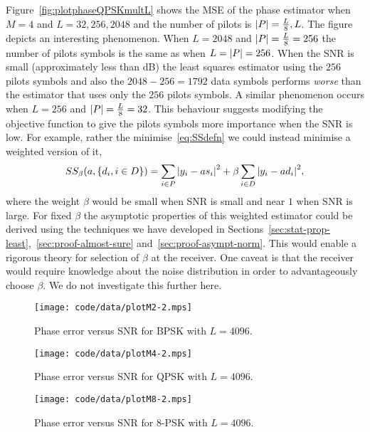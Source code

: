 \documentclass[journal]{IEEEtran}
\begin{document}
Figure~\ref{fig:plotphaseQPSKmultL} shows the MSE of the phase estimator when $M=4$ and $L=32,256, 2048$ and the number of pilots is ${\left\vert P \right\vert}=\tfrac{L}{8},L$.  The figure depicts an interesting phenomenon.  When $L=2048$ and ${\left\vert P \right\vert} = \tfrac{L}{8} = 256$ the number of pilots symbols is the same as when $L={\left\vert P \right\vert} = 256$.  When the SNR is small (approximately less than \unit[0]{dB}) the least squares estimator using the $256$ pilots symbols and also the $2048-256=1792$ data symbols performs \emph{worse} than the estimator that uses only the $256$ pilots symbols.  A similar phenomenon occurs when $L=256$ and ${\left\vert P \right\vert} = \tfrac{L}{8} = 32$.  %
This behaviour suggests modifying the objective function to give the pilots symbols more importance when the SNR is low.  For example, rather the minimise~\eqref{eq:SSdefn} we could instead minimise a weighted version of it,
\[
SS_{\beta}(a, \{d_i, i \in D\}) = \sum_{i \in P} {\left\vert  y_i - a s_i  \right\vert}^2 + \beta \sum_{i \in D} {\left\vert  y_i - a d_i  \right\vert}^2,
\]
where the weight $\beta$ would be small when SNR is small and near $1$ when SNR is large.  For fixed $\beta$ the asymptotic properties of this weighted estimator could be derived using the techniques we have developed in Sections~\ref{sec:stat-prop-least},~\ref{sec:proof-almost-sure} and~\ref{sec:proof-asympt-norm}.  This would enable a rigorous theory for selection of $\beta$ at the receiver.  One caveat is that the receiver would require knowledge about the noise distribution in order to advantageously choose $\beta$.  We do not investigate this further here.

\begin{figure}[p]
	\centering
		\texttt{[image: code/data/plotM2-2.mps]}
		\caption{Phase error versus SNR for BPSK with $L=4096$.}
		\label{fig:plotphaseBPSK}
\end{figure}

\begin{figure}[p]
	\centering
		\texttt{[image: code/data/plotM4-2.mps]}
		\caption{Phase error versus SNR for QPSK with $L=4096$.}
		\label{fig:plotphaseQPSK}
\end{figure}

\begin{figure}[p]
	\centering
		\texttt{[image: code/data/plotM8-2.mps]}
		\caption{Phase error versus SNR for $8$-PSK with $L=4096$.}
		\label{fig:plotphase8PSK}
\end{figure}
\end{document}
